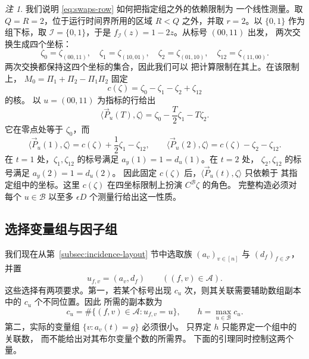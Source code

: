 \documentclass[11pt,reqno]{amsart}
\numberwithin{equation}{section}
\theoremstyle{definition}\newtheorem{definition}[theorem]{定义}
\theoremstyle{remark}\newtheorem{remark}[theorem]{注}
\begin{document}
\begin{remark}
我们说明 \eqref{eq:swaps-row} 如何把指定组之外的依赖限制为
一个线性测量。取 $Q=R=2$，位于运行时间界所用的区域 $R<Q$
之外，并取 $r=2$。以
$\{0,1\}$ 作为组下标，取 $\mathcal I=\{0,1\}$，于是
$f_{\mathcal I}(z)=1-2z$。从标号 $(00,11)$ 出发，
两次交换生成四个坐标：
\[
 \zeta_0=\zeta_{(00,11)},\quad \zeta_1=\zeta_{(10,01)},\quad
 \zeta_2=\zeta_{(01,10)},\quad \zeta_{12}=\zeta_{(11,00)}.
\]
两次交换都保持这四个坐标的集合，因此我们可以
把计算限制在其上。在该限制上，
$M_0=\Pi_1+\Pi_2-\Pi_1\Pi_2$ 固定
\[
 c(\zeta)=\zeta_0-\zeta_1-\zeta_2+\zeta_{12}
\]
的核。
以 $u=(00,11)$ 为指标的行给出
\[
 \langle \vec{P}_u(T), \zeta\rangle=\zeta_0-\frac T2\zeta_1-T\zeta_2.
\]
它在零点处等于 $\zeta_0$，而
\[
 \langle \vec{P}_u(1), \zeta\rangle=c(\zeta)+\frac12\zeta_1-\zeta_{12},\qquad
 \langle \vec{P}_u(2), \zeta\rangle=c(\zeta)-\zeta_2-\zeta_{12}.
\]
在 $t=1$ 处，$\zeta_1,\zeta_{12}$ 的标号满足
$a_y(1)=1=d_u(1)$。在 $t=2$ 处，
$\zeta_2,\zeta_{12}$ 的标号满足 $a_y(2)=1=d_u(2)$。
因此固定 $c(\zeta)$ 后，$\langle \vec{P}_u(t), \zeta\rangle$ 只依赖于
其指定组中的坐标。这里 $c(\zeta)$ 在四坐标限制上扮演
$C^{\mathcal B}\zeta$ 的角色。
完整构造必须对每个 $u\in\mathcal B$
以至多 $\epsilon D$ 个测量行给出这一性质。
\end{remark}

\subsection{选择变量组与因子组}\label{subsec:choosing-labels}
我们现在从第~\ref{subsec:incidence-layout} 节中选取族 $(a_v)_{v\in[n]}$ 与
$(d_f)_{f\in\mathcal F}$，并置
\[
 u_{f,v}=(a_v,d_f)\qquad((f,v)\in\mathcal A).
\]
这些选择有两项要求。第一，若某个标号出现 $c_u$
次，则其关联需要辅助数组副本中的 $c_u$ 个不同位置。因此
所需的副本数为
\[
 c_u=\#\{(f,v)\in\mathcal A:u_{f,v}=u\},\qquad
 h=\max_{u\in\mathcal B}c_u.
\]
第二，实际的变量组 $\{v:a_v(t)=g\}$ 必须很小。
只界定 $h$ 只能界定一个组中的关联数，
而不能给出对其布尔变量个数的所需界。
下面的引理同时控制这两个量。
\end{document}

